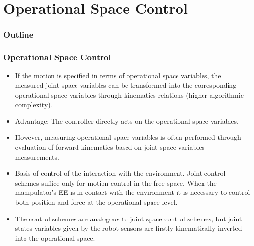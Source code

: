 \documentclass[10pt, aspectratio=169]{beamer}
\theoremstyle{remark}
\theoremstyle{definition}
\begin{document}
\section{Operational Space Control}

\begin{frame}
	\frametitle{Outline} %
	\tableofcontents[currentsection] %
\end{frame}

\begin{frame}[allowframebreaks]
	\frametitle{Operational Space Control} 

    \begin{itemize}
        \item If the motion is specified in terms of operational space variables, the measured joint space variables can be transformed into the corresponding operational space variables through kinematics relations (higher algorithmic complexity).
        \item Advantage: The controller directly acts on the operational space variables. 
        \item However, measuring operational space variables is often performed through evaluation of forward kinematics based on joint space variables measurements.
        \item Basis of control of the interaction with the environment. Joint control schemes suffice only for motion control in the free space. When the manipulator's EE is in contact with the environment it is necessary to control both position and force at the operational space level.
        \item The control schemes are analogous to joint space control schemes, but joint states variables given by the robot sensors are firstly kinematically inverted into the operational space.
    \end{itemize}
    
\end{frame}
\end{document}
